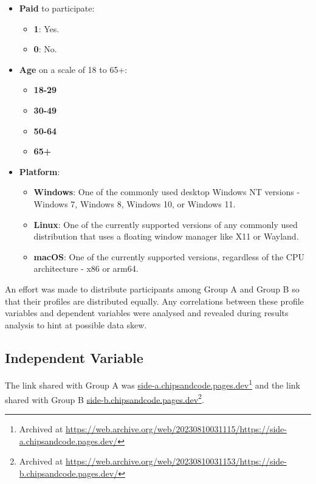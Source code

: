 \begin{itemize}
    \item \textbf{Paid} to participate:
    \begin{itemize}[]
        \item \textbf{1}: Yes.
        \item \textbf{0}: No.
    \end{itemize}
    \item \textbf{Age} on a scale of 18 to 65+:
    \begin{itemize}[]
        \item \textbf{18-29}
        \item \textbf{30-49}
        \item \textbf{50-64}
        \item \textbf{65+}
    \end{itemize}
    \item \textbf{Platform}:
    \begin{itemize}[]
        \item \textbf{Windows}: One of the commonly used desktop Windows NT versions - Windows 7, Windows 8, Windows 10, or Windows 11.
        \item \textbf{Linux}: One of the currently supported versions of any commonly used distribution that uses a floating window manager like X11 or Wayland.
        \item \textbf{macOS}: One of the currently supported versions, regardless of the CPU architecture - x86 or arm64.
    \end{itemize}
\end{itemize}

An effort was made to distribute participants among Group A and Group B so that their profiles are distributed equally.
Any correlations between these profile variables and dependent variables were analysed and revealed during results analysis to hint at possible data skew.

\subsection{Independent Variable}

The link shared with Group A was \href{https://side-a.chipsandcode.pages.dev/}{side-a.chipsandcode.pages.dev}\footnote{Archived at \url{https://web.archive.org/web/20230810031115/https://side-a.chipsandcode.pages.dev/}} and the link shared with Group B \href{https://side-b.chipsandcode.pages.dev/}{side-b.chipsandcode.pages.dev}\footnote{Archived at \url{https://web.archive.org/web/20230810031153/https://side-b.chipsandcode.pages.dev/}}.

